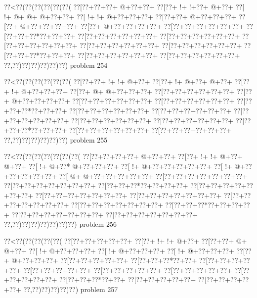 \vbox{\vbox{\goo
\0??<\0??(\0??(\0??(\0??(\0??(\0??(
\0??[\0??+\0??+\0??+\- @+\0??+\0??+
\0??[\0??+\- !+\- !+\0??+\- @+\0??+
\0??[\- !+\- @+\- @+\- @+\0??+\0??+
\0??[\- !+\- !+\- @+\0??+\0??+\0??+
\0??[\0??+\0??+\- @+\0??+\0??+\0??+
\0??[\0??+\- @+\0??+\0??+\0??+\0??+
\0??[\0??+\- @+\0??+\0??+\0??+\0??+
\0??[\0??+\0??+\0??+\0??+\0??+\0??+
\0??[\0??+\0??+\0??*\0??+\0??+\0??+
\0??[\0??+\0??+\0??+\0??+\0??+\0??+
\0??[\0??+\0??+\0??+\0??+\0??+\0??+
\0??[\0??+\0??+\0??+\0??+\0??+\0??+
\0??[\0??+\0??+\0??+\0??+\0??+\0??+
\0??[\0??+\0??+\0??+\0??+\0??+\0??+
\0??[\0??+\0??+\0??*\0??+\0??+\0??+
\0??[\0??+\0??+\0??+\0??+\0??+\0??+
\0??[\0??+\0??+\0??+\0??+\0??+\0??+
\0??,\0??)\0??)\0??)\0??)\0??)\0??)
}
\hfil problem 254\hfil\break
}

\vbox{\vbox{\goo
\0??<\0??(\0??(\0??(\0??(\0??(\0??(
\0??[\0??+\0??+\- !+\- !+\- @+\0??+
\0??[\0??+\- !+\- @+\0??+\- @+\0??+
\0??[\0??+\- !+\- @+\0??+\0??+\0??+
\0??[\0??+\- @+\- @+\0??+\0??+\0??+
\0??[\0??+\0??+\0??+\0??+\0??+\0??+
\0??[\0??+\- @+\0??+\0??+\0??+\0??+
\0??[\0??+\0??+\0??+\0??+\0??+\0??+
\0??[\0??+\0??+\0??+\0??+\0??+\0??+
\0??[\0??+\0??+\0??*\0??+\0??+\0??+
\0??[\0??+\0??+\0??+\0??+\0??+\0??+
\0??[\0??+\0??+\0??+\0??+\0??+\0??+
\0??[\0??+\0??+\0??+\0??+\0??+\0??+
\0??[\0??+\0??+\0??+\0??+\0??+\0??+
\0??[\0??+\0??+\0??+\0??+\0??+\0??+
\0??[\0??+\0??+\0??*\0??+\0??+\0??+
\0??[\0??+\0??+\0??+\0??+\0??+\0??+
\0??[\0??+\0??+\0??+\0??+\0??+\0??+
\0??,\0??)\0??)\0??)\0??)\0??)\0??)
}
\hfil problem 255\hfil\break
}

\vbox{\vbox{\goo
\0??<\0??(\0??(\0??(\0??(\0??(\0??(\0??(
\0??[\0??+\0??+\0??+\0??+\- @+\0??+\0??+
\0??[\0??+\- !+\- !+\- @+\0??+\- @+\0??+
\0??[\- !+\- @+\0??*\- @+\0??+\0??+\0??+
\0??[\- !+\- @+\0??+\0??+\0??+\0??+\0??+
\0??[\- !+\- @+\0??+\0??+\0??+\0??+\0??+
\0??[\- @+\- @+\0??+\0??+\0??+\0??+\0??+
\0??[\0??+\0??+\0??+\0??+\0??+\0??+\0??+
\0??[\0??+\0??+\0??+\0??+\0??+\0??+\0??+
\0??[\0??+\0??+\0??*\0??+\0??+\0??+\0??+
\0??[\0??+\0??+\0??+\0??+\0??+\0??+\0??+
\0??[\0??+\0??+\0??+\0??+\0??+\0??+\0??+
\0??[\0??+\0??+\0??+\0??+\0??+\0??+\0??+
\0??[\0??+\0??+\0??+\0??+\0??+\0??+\0??+
\0??[\0??+\0??+\0??+\0??+\0??+\0??+\0??+
\0??[\0??+\0??+\0??*\0??+\0??+\0??+\0??+
\0??[\0??+\0??+\0??+\0??+\0??+\0??+\0??+
\0??[\0??+\0??+\0??+\0??+\0??+\0??+\0??+
\0??,\0??)\0??)\0??)\0??)\0??)\0??)\0??)
}
\hfil problem 256\hfil\break
}

\vbox{\vbox{\goo
\0??<\0??(\0??(\0??(\0??(\0??(
\0??[\0??+\0??+\0??+\0??+\0??+
\0??[\0??+\- !+\- !+\- @+\0??+
\0??[\0??+\0??+\- @+\- @+\0??+
\0??[\- !+\- @+\0??+\0??+\0??+
\0??[\- !+\- @+\0??+\0??+\0??+
\0??[\- !+\- @+\0??+\0??+\0??+
\0??[\0??+\- @+\0??+\0??+\0??+
\0??[\0??+\0??+\0??+\0??+\0??+
\0??[\0??+\0??+\0??*\0??+\0??+
\0??[\0??+\0??+\0??+\0??+\0??+
\0??[\0??+\0??+\0??+\0??+\0??+
\0??[\0??+\0??+\0??+\0??+\0??+
\0??[\0??+\0??+\0??+\0??+\0??+
\0??[\0??+\0??+\0??+\0??+\0??+
\0??[\0??+\0??+\0??*\0??+\0??+
\0??[\0??+\0??+\0??+\0??+\0??+
\0??[\0??+\0??+\0??+\0??+\0??+
\0??,\0??)\0??)\0??)\0??)\0??)
}
\hfil problem 257\hfil\break
}

